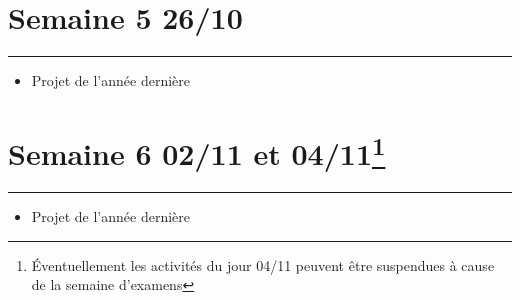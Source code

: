 \documentclass[11pt,a4paper,onecolumn]{articlewithlogo}
\begin{document}
\section*{Semaine 5 \footnotesize{26/10}}
\hrule

\vspace{3mm}
\begin{itemize}
	\renewcommand\labelitemi{--}
	\item Projet de l'année dernière 
\end{itemize}

\section*{Semaine 6 \footnotesize{02/11 et 04/11\footnote{Éventuellement les activités du jour 04/11 peuvent être suspendues à cause de la semaine d'examens   }}}
\hrule

\vspace{3mm}
\begin{itemize}
	\renewcommand\labelitemi{--}
	\item Projet de l'année dernière 
\end{itemize}


%
\end{document}
